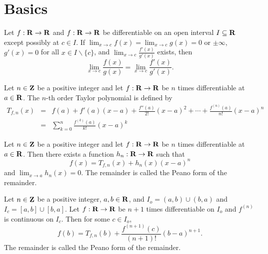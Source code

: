 
\section{Basics}

\begin{theorem}
Let $f:\mathbf{R}\to\mathbf{R}$ and $f:\mathbf{R}\to\mathbf{R}$ be differentiable on an open interval $I\subseteq \mathbf{R}$
except possibly at $c\in I$.
If $\lim_{x\to c} f(x) = \lim_{x\to c} g(x) = 0$ or $\pm \infty$,
$g'(x)=0$ for all $x\in I\backslash \{c\}$,
and $\lim_{x\to c} \frac{f'(x)}{g'(x)}$ exists,
then
\begin{equation}
\label{eq:lhopital-rule}
\lim_{x\to c} \frac{f(x)}{g(x)}
= \lim_{x\to c} \frac{f'(x)}{g'(x)}.
\end{equation}
\end{theorem}

\begin{definition}
Let $n\in{\mbox{\bf Z}}$ be a positive integer and
let $f:\mathbf{R}\to\mathbf{R}$ be $n$ times differentiable at $a\in\mathbf{R}$.
The $n$-th order Taylor polynomial is defined by
\begin{eqnarray}
T_{f,n}(x) &=& f(a) + f'(a)(x-a)
+ \frac{f''(a)}{2!}(x-a)^2
+ \cdots
+ \frac{f^{(n)}(a)}{n!}(x-a)^n
\nonumber
\\
&=&
\sum_{k=0}^n \frac{f^{(k)}(a)}{k!} (x-a)^k
\label{eq:taylor-poly}
\end{eqnarray}
\end{definition}


\begin{theorem}
\label{theorem:taylor-peano}
Let $n\in{\mbox{\bf Z}}$ be a positive integer and
let $f:\mathbf{R}\to\mathbf{R}$ be $n$ times differentiable at $a\in\mathbf{R}$.
Then there exists a function $h_n:\mathbf{R}\to\mathbf{R}$ such that
\begin{equation}
\label{eq:taylor-peano}
f(x) = T_{f,n}(x) + h_n(x) (x-a)^n
\end{equation}
and $\lim_{x\to a} h_n(x)=0$.
The remainder is called the Peano form of the remainder.
\end{theorem}

\begin{theorem}
\label{theorem:taylor-lagrange}
Let $n\in{\mbox{\bf Z}}$ be a positive integer, $a,b\in\mathbf{R}$,
and $I_o = (a,b) \cup (b,a)$ and $I_c = [a,b] \cup [b,a]$.
Let $f:\mathbf{R}\to\mathbf{R}$ be $n+1$ times differentiable on $I_o$
and $f^{(n)}$ is continuous on $I_c$.
Then for some $c \in I_o$,
\begin{equation}
\label{eq:taylor-lagrange}
f(b) = T_{f,n}(b) + \frac{f^{(n+1)}(c)}{(n+1)!}(b-a)^{n+1}.
\end{equation}
The remainder is called the Peano form of the remainder.
\end{theorem}


